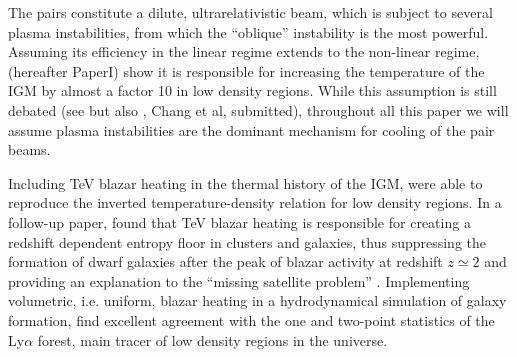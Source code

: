 \documentclass[twocolumns]{emulateapj}
\begin{document}
The pairs constitute a dilute, ultrarelativistic beam, which is subject to several plasma instabilities, from which the ``oblique'' instability \citep{PhysRevE.70.046401} is the most powerful. Assuming its efficiency in the linear regime extends to the non-linear regime, \citet{2012ApJ...752...23C} (hereafter PaperI) show it is responsible for increasing the temperature of the IGM by almost a factor 10 in low density regions. While this assumption is still debated (see \citet{2013ApJ...770...54M,2014ApJ...787...49S} but also \citet{2013arXiv1311.6752S,2013ApJ...777...49S,2012ApJ...758..102S}, Chang et al, submitted), throughout all this paper we will assume plasma instabilities are the dominant mechanism for cooling of the pair beams.


Including TeV blazar heating in the thermal history of the IGM, \citet{2012ApJ...752...23C} were able to reproduce the inverted temperature-density relation for low density regions. In a follow-up paper, \citet{2012ApJ...752...24P} found that TeV blazar heating is responsible for creating  a redshift dependent entropy floor in clusters and galaxies, thus suppressing the formation of dwarf galaxies after the peak of blazar activity at redshift $z\simeq2$ and providing an explanation to the ``missing satellite problem'' \citep{2010AdAst2010E...8K}. Implementing volumetric, i.e. uniform, blazar heating in a hydrodynamical simulation of galaxy formation, \citet{2012MNRAS.423..149P} find excellent agreement with the one and two-point statistics of the Ly$\alpha$ forest, main tracer of low density regions in the universe.
\end{document}
